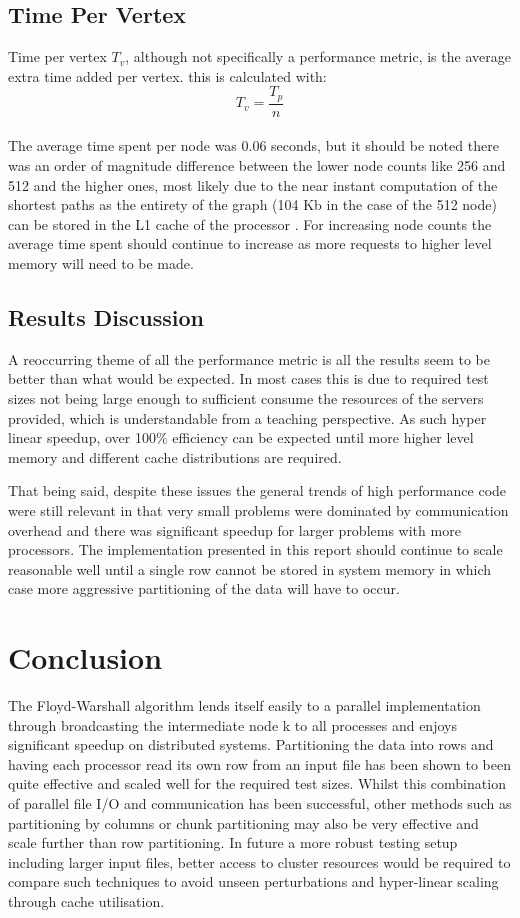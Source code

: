 \documentclass[12pt]{article}
\begin{document}

\subsection{Time Per Vertex}
Time per vertex \(T_v\), although not specifically a performance metric, is the average extra time added per vertex. this is calculated with:
\[T_v = \frac{T_p}{n}\] \\
The average time spent per node was 0.06 seconds, but it should be noted there was an order of magnitude difference between the lower node counts like 256 and 512 and the higher ones, most likely due to the near instant computation of the shortest paths as the entirety of the graph (104 Kb in the case of the 512 node) can be stored in the L1 cache of the processor \cite{forum}. For increasing node counts the average time spent should continue to increase as more requests to higher level memory will need to be made. 


\subsection{Results Discussion}

A reoccurring theme of all the performance metric is all the results seem to be better than what would be expected. In most cases this is due to required test sizes not being large enough to sufficient consume the resources of the servers provided, which is understandable from a teaching perspective. As such hyper linear speedup, over 100\% efficiency can be expected until more higher level memory and different cache distributions are required. 

That being said, despite these issues the general trends of high performance code were still relevant in that very small problems were dominated by communication overhead and there was significant speedup for larger problems with more processors. The implementation presented in this report should continue to scale reasonable well until a single row cannot be stored in system memory in which case more aggressive partitioning of the data will have to occur. 


\section{Conclusion}

The Floyd-Warshall algorithm lends itself easily to a parallel implementation through broadcasting the intermediate node k to all processes and enjoys significant speedup on distributed systems. Partitioning the data into rows and having each processor read its own row from an input file has been shown to been quite effective and scaled well for the required test sizes. Whilst this combination of parallel file I/O and communication has been successful, other methods such as partitioning by columns or chunk partitioning may also be very effective and scale further than row partitioning. In future a more robust testing setup including larger input files, better access to cluster resources would be required to compare such techniques to avoid unseen perturbations and hyper-linear scaling through cache utilisation. 

 
 

 
\end{document}
